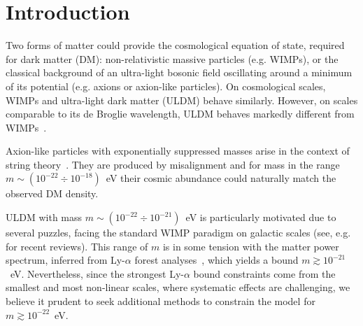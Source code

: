 \documentclass[aps,prd,floats,superscriptaddress,showpacs,nofootinbib,twocolumn,preprintnumbers]{revtex4-1}%
\begin{document}
\maketitle



\section{Introduction}
%
Two forms of matter could provide the cosmological equation of state,
required for dark matter (DM):  non-relativistic massive particles
(e.g. WIMPs), or the classical background of an ultra-light bosonic
field oscillating around a minimum of its potential (e.g. axions or
axion-like particles).  
%
On cosmological scales, WIMPs and ultra-light dark matter (ULDM)
behave similarly. However, on scales comparable to its de Broglie
wavelength, ULDM behaves markedly different from 
WIMPs~\cite{Hu:2000ke,Arbey:2001qi,Lesgourgues:2002hk,Chavanis:2011zi,Chavanis:2011zm,Schive:2014dra,Schive:2014hza,Marsh:2015wka,Chen:2016unw,Schwabe:2016rze,Veltmaat:2016rxo,Hui:2016ltb,Mocz:2017wlg}. 

Axion-like particles with exponentially suppressed masses arise in the
context of string
theory~\cite{Svrcek:2006yi,Arvanitaki:2009fg,Marsh:2015xka,Hui:2016ltb}. They
are produced by misalignment 
and for mass in the range $m\sim (10^{-22}\div 10^{-18})$~eV their
cosmic abundance could naturally match the observed DM density.

ULDM with mass $m\sim (10^{-22} \div 10^{-21})$~eV is particularly
motivated due to several  puzzles, facing the standard WIMP paradigm
on galactic scales (see, e.g.~\cite{DelPopolo:2016emo,Hui:2016ltb} for
recent reviews). This range of $m$ is in some tension with the matter power spectrum, inferred from Ly-$\alpha$
forest
analyses~\cite{Bozek:2014uqa,Armengaud:2017nkf,Irsic:2017yje,Zhang:2017chj,Kobayashi:2017jcf}, which 
yields a bound $m\gtrsim10^{-21}$~eV. Nevertheless, since the
strongest Ly-$\alpha$ bound constraints come from the smallest and 
most non-linear
scales, where systematic effects are challenging, we believe it 
prudent to seek additional methods to constrain the model for
$m\gtrsim10^{-22}$~eV.   
\end{document}
